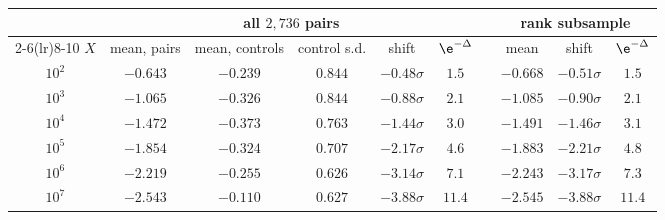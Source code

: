 \begin{tabular}{@{}cccccc c ccc@{}}
\toprule
 & \multicolumn{5}{c}{all $2{,}736$ pairs} & & \multicolumn{3}{c}{rank subsample}\\
\cmidrule(lr){2-6}\cmidrule(lr){8-10}
$X$ & mean, pairs & mean, controls & control s.d. & shift & $\e^{-\Delta}$ & & mean & shift & $\e^{-\Delta}$\\
\midrule
$10^{2}$ & $-0.643$ & $-0.239$ & $0.844$ & $-0.48\sigma$ & $1.5$ & & $-0.668$ & $-0.51\sigma$ & $1.5$\\
$10^{3}$ & $-1.065$ & $-0.326$ & $0.844$ & $-0.88\sigma$ & $2.1$ & & $-1.085$ & $-0.90\sigma$ & $2.1$\\
$10^{4}$ & $-1.472$ & $-0.373$ & $0.763$ & $-1.44\sigma$ & $3.0$ & & $-1.491$ & $-1.46\sigma$ & $3.1$\\
$10^{5}$ & $-1.854$ & $-0.324$ & $0.707$ & $-2.17\sigma$ & $4.6$ & & $-1.883$ & $-2.21\sigma$ & $4.8$\\
$10^{6}$ & $-2.219$ & $-0.255$ & $0.626$ & $-3.14\sigma$ & $7.1$ & & $-2.243$ & $-3.17\sigma$ & $7.3$\\
$10^{7}$ & $-2.543$ & $-0.110$ & $0.627$ & $-3.88\sigma$ & $11.4$ & & $-2.545$ & $-3.88\sigma$ & $11.4$\\
\bottomrule
\end{tabular}

